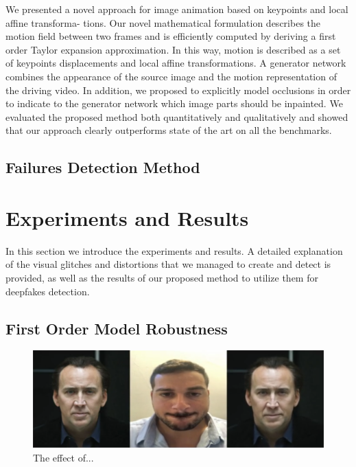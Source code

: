 \documentclass[english,12pt]{article}
\begin{document}

We presented a novel approach for image animation based on keypoints and local affine transforma- tions. Our
novel mathematical formulation describes the motion field between two frames and is efficiently computed by
deriving a first order Taylor expansion approximation. In this way, motion is described as a set of keypoints
displacements and local affine transformations. A generator network combines the appearance of the source image
and the motion representation of the driving video. In addition, we proposed to explicitly model occlusions in
order to indicate to the generator network which image parts should be inpainted. We evaluated the proposed
method both quantitatively and qualitatively and showed that our approach clearly outperforms state of the art
on all the benchmarks.




\subsection{Failures Detection Method}



\section{Experiments and Results} \label{experiments and results}

In this section we introduce the experiments and results. A detailed explanation of the
visual glitches and distortions that we managed to create and detect is provided, as well
as the results of our proposed method to utilize them for deepfakes detection.

\subsection{First Order Model Robustness}

\begin{figure}[htb]
  \begin{centering}
      \includegraphics[scale=0.29]{images/‏‏Amit_lips_cage.PNG}
  \par\end{centering}
  \caption{\label{fig:Amit_lips_cage}The effect of...}
\end{figure}
\end{document}
